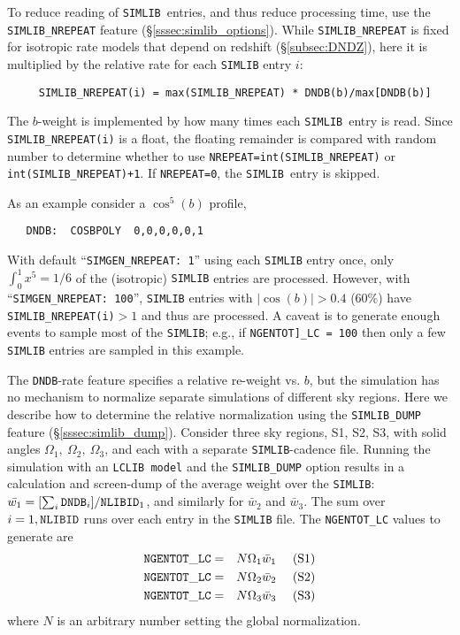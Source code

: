 \documentclass[12pt]{article}
\newcommand{\simlib}{{\tt SIMLIB}}
\begin{document}
To reduce reading of \simlib\ entries,
and thus reduce processing time, 
use the {\tt SIMLIB\_NREPEAT} feature (\S\ref{sssec:simlib_options}).
While {\tt SIMLIB\_NREPEAT} is fixed for isotropic rate models
that depend on redshift (\S\ref{subsec:DNDZ}), 
here it is multiplied by the relative rate for each {\tt SIMLIB} entry $i$:
\begin{verbatim}
     SIMLIB_NREPEAT(i) = max(SIMLIB_NREPEAT) * DNDB(b)/max[DNDB(b)]
\end{verbatim}
The $b$-weight is implemented by how many times each
\simlib\ entry is read. Since {\tt SIMLIB\_NREPEAT(i)} is a float, 
the floating remainder is compared with random number
to determine whether to use 
{\tt NREPEAT=int(SIMLIB\_NREPEAT)} or {\tt int(SIMLIB\_NREPEAT)+1}.
If {\tt NREPEAT=0}, the \simlib\ entry is skipped.

\medskip
As an  example consider a $\cos^5(b)$ profile,
\vspace{-0.2cm}
\begin{verbatim}
   DNDB:  COSBPOLY  0,0,0,0,0,1
\end{verbatim}
With default ``{\tt SIMGEN\_NREPEAT: 1}'' using each
{\tt SIMLIB} entry once,
only $\int_0^1 x^5 = 1/6$ of the (isotropic) {\tt SIMLIB} entries
are processed.
However, with ``{\tt SIMGEN\_NREPEAT: 100}'', 
{\tt SIMLIB} entries with $|\cos(b)| > 0.4$ (60\%) have 
{\tt SIMLIB\_NREPEAT(i)}$>1$ and thus are processed.
A caveat is to generate enough events to sample most of
the {\tt SIMLIB}; e.g., if {\tt NGENTOT]\_LC = 100} then
only a few {\tt SIMLIB} entries are sampled in this example.


\clearpage
The {\tt DNDB}-rate feature specifies a relative re-weight vs. $b$,
but the simulation has no mechanism to normalize separate simulations
of different sky regions. Here we describe how to determine
the relative normalization using the 
{\tt SIMLIB\_DUMP} feature (\S\ref{sssec:simlib_dump}).
Consider three sky regions, S1, S2, S3, with solid angles
$\Omega_1,~\Omega_2,~\Omega_3$, and each with a separate 
{\tt SIMLIB}-cadence file.
Running the simulation with an {\tt LCLIB model} and the
{\tt SIMLIB\_DUMP} option results in a calculation and screen-dump
of the average weight over the {\tt SIMLIB}: 
$\bar{w_1} = [\sum_i{\tt DNDB}_i]/{\tt NLIBID}_1$,
and similarly for $\bar{w}_2$ and $\bar{w}_3$. 
The sum over $i=1, {\tt NLIBID}$ runs over each entry in the 
{\tt SIMLIB} file. The {\tt NGENTOT\_LC} values to generate are
%
\begin{eqnarray}
 {\tt NGENTOT\_LC} & = & N \Omega_1 \bar{w}_1~~~~({\rm S1}) 
    \nonumber \\
 {\tt NGENTOT\_LC} & = & N \Omega_2 \bar{w}_2~~~~({\rm S2}) 
    \nonumber \\
 {\tt NGENTOT\_LC} & = & N \Omega_3 \bar{w}_3~~~~({\rm S3}) 
    \nonumber
\end{eqnarray}
%
where $N$ is an arbitrary number setting the global normalization.
\end{document}
